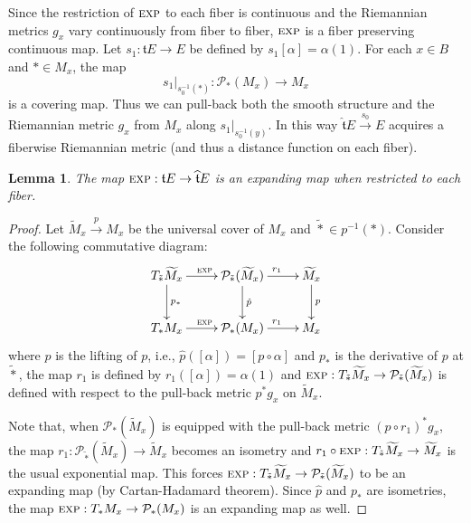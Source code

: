 \documentclass[onecolumn,notitlepage,11pt]{article}
\newcommand{\p}{\mathcal{P}}
\newcommand{\beq}{\begin{equation*}}
\newcommand{\eeq}{\end{equation*}}
\newtheorem{lemma}{Lemma}[section]
\theoremstyle{definition}
\begin{document}
Since the restriction of $\textsc{exp}$ to each fiber is continuous and 
the Riemannian metrics $g_x$ vary continuously from fiber to fiber, 
$\textsc{exp}$ is a fiber preserving continuous map. 
Let
$s_1:\widehat{\mathfrak{t}}E\to E$ be defined by $s_1[\alpha]=\alpha(1)$.
For each $x\in B$ and $\ast\in M_x$, the map
\beq
s_1|_{s_0^{-1}(\ast)}:\p_{\ast}(M_x)\to M_x
\eeq
is a covering map. Thus we can pull-back 
both the smooth structure and the Riemannian metric $g_x$ from $M_x$
along $s_1|_{s_0^{-1}(y)}$. In this way
$\widehat{\mathfrak{t}}E\xrightarrow{s_0} E$ acquires
a fiberwise Riemannian metric (and thus a distance function on each
fiber). 
\begin{lemma}\label{expanding}
The map $\textsc{exp}:\mathfrak{t}E\to\widehat{\mathfrak{t}}E$
is an expanding map when restricted to each fiber.
\end{lemma}
\begin{proof}
Let $\widetilde{M}_x\xrightarrow{p} M_x$ be the universal cover of $M_x$
and $\tilde{\ast}\in p^{-1}(\ast)$. Consider the
following commutative diagram:
\beq
\xymatrix{
T_{\tilde{\ast}}\widetilde{M}_x\ar[d]^{p_*}\ar[r]^{\textsc{exp}}&\p_{\tilde{\ast}}(\widetilde{M}_x)\ar[d]^{\hat{p}}\ar[r]^{r_1}&\widetilde{M}_x\ar[d]^{p}\\
T_{\ast}M_x\ar[r]^{\textsc{exp}}&\p_{\ast}(M_x)\ar[r]^{r_1}&M_x
}
\eeq
where $\hat{p}$ is the lifting of $p$, i.e., 
$\hat{p}([\alpha])=[p\circ\alpha]$ and $p_*$ is the derivative of $p$ at
$\tilde{\ast}$, the map $r_1$ is defined by $r_1([\alpha])=\alpha(1)$ and 
$\textsc{exp}:T_{\tilde{\ast}}\widetilde{M}_x\to\p_{\tilde{\ast}}(\widetilde{M}_x)$ is defined with respect to the pull-back metric
$p^*g_x$ on $\widetilde{M}_x$.

Note that, when $\mathcal{P}_{\ast}(\widetilde{M}_x)$ is equipped with
the pull-back metric $(p\circ r_1)^*g_x$, the map $r_1:\p_{\tilde{\ast}}(\widetilde{M}_x)\to
\widetilde{M}_x$ becomes an isometry and $r_1\circ\textsc{exp}:
T_{\tilde{\ast}}\widetilde{M}_x\to\widetilde{M}_x$ is the usual exponential
map. This forces
$\textsc{exp}:T_{\tilde{\ast}}\widetilde{M}_x\to\p_{\tilde{\ast}}(\widetilde{M}_x)$ to be an expanding map (by Cartan-Hadamard theorem).
Since $\hat{p}$ and $p_*$ are isometries, the map 
$\textsc{exp}:T_{\ast}M_x\to\p_{\ast}(M_x)$ is an expanding map as well.
\end{proof}
\end{document}
